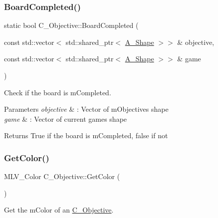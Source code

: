 \subsubsection{\texorpdfstring{Board\+Completed()}{BoardCompleted()}\hspace{0.1cm}{\footnotesize\ttfamily [2/2]}}
{\footnotesize\ttfamily static bool C\+\_\+\+Objective\+::\+Board\+Completed (\begin{DoxyParamCaption}\item[{const std\+::vector$<$ std\+::shared\+\_\+ptr$<$ \hyperlink{classA__Shape}{A\+\_\+\+Shape} $>$$>$ \&}]{objective,  }\item[{const std\+::vector$<$ std\+::shared\+\_\+ptr$<$ \hyperlink{classA__Shape}{A\+\_\+\+Shape} $>$$>$ \&}]{game }\end{DoxyParamCaption})\hspace{0.3cm}{\ttfamily [static]}}



Check if the board is m\+Completed. 


\begin{DoxyParams}{Parameters}
{\em objective} & \+: Vector of m\+Objective\textquotesingle{}s shape \\
\hline
{\em game} & \+: Vector of current game\textquotesingle{}s shape \\
\hline
\end{DoxyParams}
\begin{DoxyReturn}{Returns}
True if the board is m\+Completed, false if not 
\end{DoxyReturn}
\mbox{\label{classC__Objective_aeaaa69ca15b1e1d8edbc3f1920399964}} 
\subsubsection{\texorpdfstring{Get\+Color()}{GetColor()}\hspace{0.1cm}{\footnotesize\ttfamily [1/2]}}
{\footnotesize\ttfamily M\+L\+V\+\_\+\+Color C\+\_\+\+Objective\+::\+Get\+Color (\begin{DoxyParamCaption}{ }\end{DoxyParamCaption})}



Get the m\+Color of an \hyperlink{classC__Objective}{C\+\_\+\+Objective}. 

